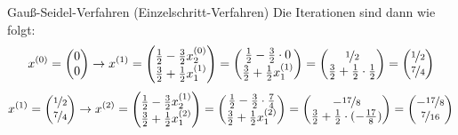 \begin{example}{Gauß-Seidel-Verfahren (Einzelschritt-Verfahren)}
    Die Iterationen sind dann wie folgt:
    \[
        x^{(0)} = \begin{pmatrix}
            0 \\
            0
        \end{pmatrix}
        \to
        x^{(1)} = \begin{pmatrix}
            \frac{1}{2} - \frac{3}{2} x_2^{(0)} \\
            \frac{3}{2} + \frac{1}{2} x_1^{(1)}
        \end{pmatrix}
        = \begin{pmatrix}
            \frac{1}{2} - \frac{3}{2} \cdot 0 \\
            \frac{3}{2} + \frac{1}{2} x_1^{(1)}
        \end{pmatrix}
        = \begin{pmatrix}
            \nicefrac{1}{2} \\
            \frac{3}{2} + \frac{1}{2} \cdot \frac{1}{2}
        \end{pmatrix}
        = \begin{pmatrix}
            \nicefrac{1}{2} \\
            \nicefrac{7}{4}
        \end{pmatrix}
    \]
    \[
        x^{(1)} = \begin{pmatrix}
            \nicefrac{1}{2} \\
            \nicefrac{7}{4}
        \end{pmatrix}
        \to
        x^{(2)} = \begin{pmatrix}
            \frac{1}{2} - \frac{3}{2}x_2^{(1)} \\
            \frac{3}{2} + \frac{1}{2}x_1^{(2)}
        \end{pmatrix}
        = \begin{pmatrix}
            \frac{1}{2} - \frac{3}{2} \cdot \frac{7}{4} \\
            \frac{3}{2} + \frac{1}{2}x_1^{(2)}
        \end{pmatrix}
        = \begin{pmatrix}
            -\nicefrac{17}{8} \\
            \frac{3}{2} + \frac{1}{2} \cdot (-\frac{17}{8})
        \end{pmatrix}
        = \begin{pmatrix}
            -\nicefrac{17}{8} \\
            \nicefrac{7}{16}
        \end{pmatrix}
    \]
    \[
\]
\end{example}
